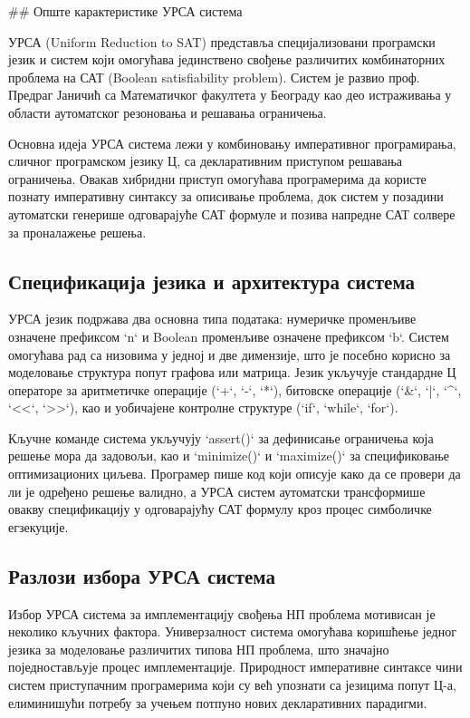 \documentclass[12pt,oneside]{memoir}
\begin{document}
## Опште карактеристике УРСА система

УРСА (Uniform Reduction to SAT) представља специјализовани програмски језик и систем који омогућава јединствено свођење различитих комбинаторних проблема на САТ (Boolean satisfiability problem). Систем је развио проф. Предраг Јаничић са Математичког факултета у Београду као део истраживања у области аутоматског резоновања и решавања ограничења.

Основна идеја УРСА система лежи у комбиновању императивног програмирања, сличног програмском језику Ц, са декларативним приступом решавања ограничења. Овакав хибридни приступ омогућава програмерима да користе познату императивну синтаксу за описивање проблема, док систем у позадини аутоматски генерише одговарајуће САТ формуле и позива напредне САТ солвере за проналажење решења.

\subsection{Спецификација језика и архитектура система}

УРСА језик подржава два основна типа података: нумеричке променљиве означене префиксом `n` и Boolean променљиве означене префиксом `b`. Систем омогућава рад са низовима у једној и две димензије, што је посебно корисно за моделовање структура попут графова или матрица. Језик укључује стандардне Ц операторе за аритметичке операције (`+`, `-`, `*`), битовске операције (`&`, `|`, `^`, `<<`, `>>`), као и уобичајене контролне структуре (`if`, `while`, `for`).

Кључне команде система укључују `assert()` за дефинисање ограничења која решење мора да задовољи, као и `minimize()` и `maximize()` за спецификовање оптимизационих циљева. Програмер пише код који описује како да се провери да ли је одређено решење валидно, а УРСА систем аутоматски трансформише овакву спецификацију у одговарајућу САТ формулу кроз процес симболичке егзекуције.

\subsection{Разлози избора УРСА система}

Избор УРСА система за имплементацију свођења НП проблема мотивисан је неколико кључних фактора. Универзалност система омогућава коришћење једног језика за моделовање различитих типова НП проблема, што значајно поједностављује процес имплементације. Природност императивне синтаксе чини систем приступачним програмерима који су већ упознати са језицима попут Ц-а, елиминишући потребу за учењем потпуно нових декларативних парадигми.
\end{document}
